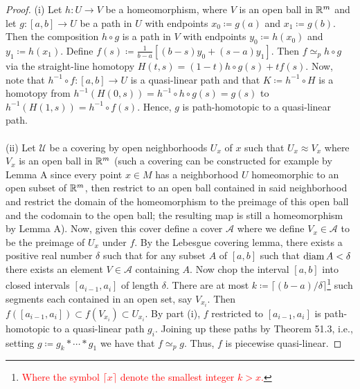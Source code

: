 \begin{proof}
(i) Let $h\colon U\to V$ be a homeomorphism, where $V$ is an open ball in
$\mathbb{R}^m$ and let $g\colon[a,b]\to U$  be a path in $U$ with endpoints
$x_0\coloneqq g(a)$ and $x_1\coloneqq g(b)$. Then the composition $h\circ
g$ is a path in $V$ with endpoints $y_0\coloneqq h(x_0)$ and $y_1\coloneqq
h(x_1)$. Define $f(s)\coloneqq \frac{1}{b-a}[(b-s)y_0+(s-a)y_1]$. Then
$f\simeq_p h\circ g$ via the straight-line homotopy $H(t,s)=(1-t)h\circ
g(s)+tf(s)$. Now, note that $h^{-1}\circ f\colon[a,b]\to U$ is a
quasi-linear path and that $K\coloneqq h^{-1}\circ H$ is a homotopy from
$h^{-1}(H(0,s))=h^{-1}\circ h\circ g(s)=g(s)$ to
$h^{-1}(H(1,s))=h^{-1}\circ f(s)$. Hence, $g$ is path-homotopic to a
quasi-linear path.
\\\\
(ii) Let
$\mathcal{U}$ be a covering by open neighborhoods $U_x$ of $x$ such that
$U_x\approx V_x$ where $V_x$ is an open ball in $\mathbb{R}^m$ (such a covering
can be constructed for example by Lemma A since every point $x\in M$ has a
neighborhood $U$ homeomorphic to an open subset of $\mathbb{R}^m$, then restrict
to an open ball contained in said neighborhood and restrict the domain of
the homeomorphism to the preimage of this open ball and the codomain to the
open ball; the resulting map is still a homeomorphism by Lemma A). Now,
given this cover define a cover $\mathcal{A}$ where we define
$V_x\in\mathcal{A}$ to be the preimage of $U_x$ under $f$. By the
Lebesgue covering lemma, there exists a positive real number $\delta$ such
that for any subset $A$ of $[a,b]$ such that $\operatorname{diam} A<\delta$ there exists an
element $V\in\mathcal{A}$ containing $A$. Now chop the interval $[a,b]$
into closed intervals $[a_{i-1},a_i]$ of length $\delta$. There are at most
$k\coloneqq\lceil(b-a)/\delta\rceil$\footnote{\textcolor{Red}{Where the
    symbol     $\lceil x\rceil$ denote the smallest integer $k>x$.}} such
segments each contained in an open set, say $V_{x_i}$. Then
$f([a_{i-1},a_i])\subset f(V_{x_i})\subset U_{x_i}$. By part (i), $f$
restricted to $[a_{i-1},a_i]$ is path-homotopic to a quasi-linear path
$g_i$. Joining up these paths by Theorem 51.3, i.e., setting $g\coloneqq
g_k*\cdots*g_1$ we have that $f\simeq_p g$. Thus, $f$ is piecewise
quasi-linear.
\end{proof}
